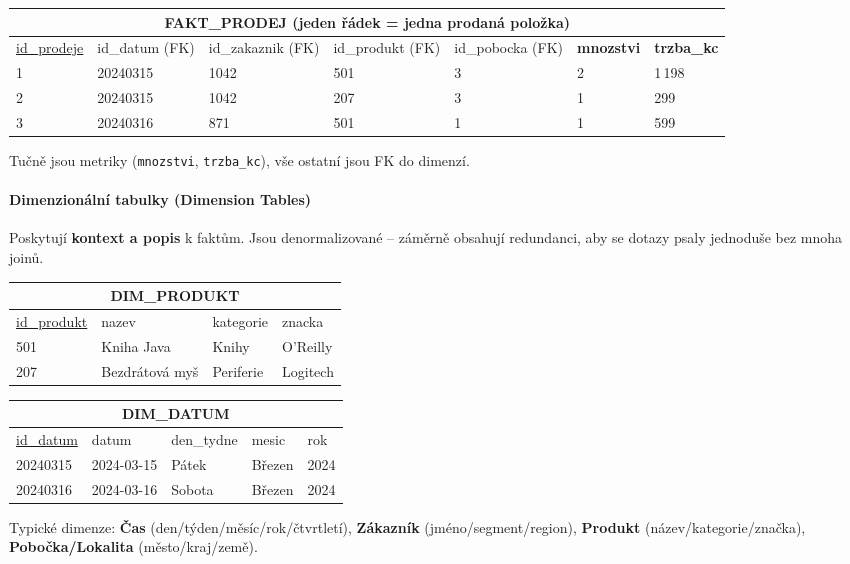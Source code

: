 \begin{center}\footnotesize
\begin{tabular}{lllllll}
\toprule
\multicolumn{7}{c}{\textbf{FAKT\_PRODEJ} (jeden řádek = jedna prodaná položka)} \\
\midrule
\underline{id\_prodeje} & id\_datum (FK) & id\_zakaznik (FK) & id\_produkt (FK) & id\_pobocka (FK) & \textbf{mnozstvi} & \textbf{trzba\_kc} \\
1 & 20240315 & 1042 & 501 & 3 & 2 & 1\,198 \\
2 & 20240315 & 1042 & 207 & 3 & 1 & 299 \\
3 & 20240316 & 871  & 501 & 1 & 1 & 599 \\
\bottomrule
\end{tabular}
\end{center}

Tučně jsou metriky (\texttt{mnozstvi}, \texttt{trzba\_kc}), vše ostatní jsou FK do dimenzí.

\paragraph{Dimenzionální tabulky (Dimension Tables)}
Poskytují \textbf{kontext a popis} k faktům. Jsou denormalizované -- záměrně obsahují redundanci,
aby se dotazy psaly jednoduše bez mnoha joinů.

\begin{center}\footnotesize
\begin{tabular}{llll}
\toprule
\multicolumn{4}{c}{\textbf{DIM\_PRODUKT}} \\
\midrule
\underline{id\_produkt} & nazev & kategorie & znacka \\
501 & Kniha Java & Knihy & O'Reilly \\
207 & Bezdrátová myš & Periferie & Logitech \\
\bottomrule
\end{tabular}
\quad
\begin{tabular}{lllll}
\toprule
\multicolumn{5}{c}{\textbf{DIM\_DATUM}} \\
\midrule
\underline{id\_datum} & datum & den\_tydne & mesic & rok \\
20240315 & 2024-03-15 & Pátek & Březen & 2024 \\
20240316 & 2024-03-16 & Sobota & Březen & 2024 \\
\bottomrule
\end{tabular}
\end{center}

Typické dimenze: \textbf{Čas} (den/týden/měsíc/rok/čtvrtletí), \textbf{Zákazník} (jméno/segment/region),
\textbf{Produkt} (název/kategorie/značka), \textbf{Pobočka/Lokalita} (město/kraj/země).

